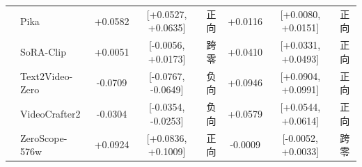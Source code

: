 \begin{table}[!t]
{\begin{tabular}{llcccccc}
     & Pika & +0.0582 & [+0.0527, +0.0635] & 正向 & +0.0116 & [+0.0080, +0.0151] & 正向 \\
     & SoRA-Clip & +0.0051 & [-0.0056, +0.0173] & 跨零 & +0.0410 & [+0.0331, +0.0493] & 正向 \\
     & Text2Video-Zero & -0.0709 & [-0.0767, -0.0649] & 负向 & +0.0946 & [+0.0904, +0.0991] & 正向 \\
     & VideoCrafter2 & -0.0304 & [-0.0354, -0.0253] & 负向 & +0.0579 & [+0.0544, +0.0614] & 正向 \\
     & ZeroScope-576w & +0.0924 & [+0.0836, +0.1009] & 正向 & -0.0009 & [-0.0052, +0.0033] & 跨零 \\
    \bottomrule
  \end{tabular}%
  }
\end{table}
